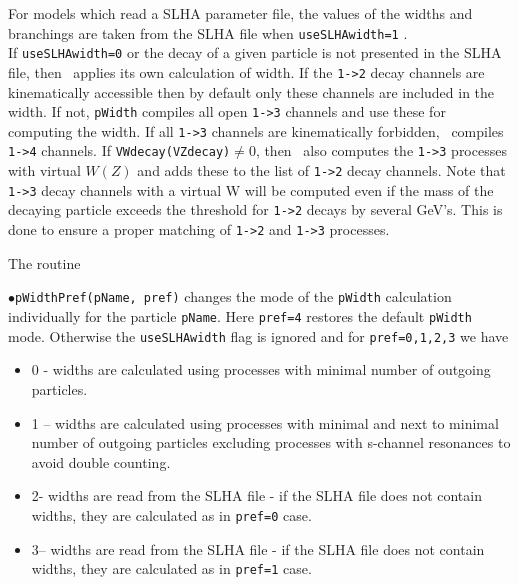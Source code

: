 \documentclass[12pt,a4paper]{article}
\begin{document}
For models which read a SLHA parameter file, the values of the widths and branchings are taken from the SLHA
file when \verb|useSLHAwidth=1| .\\[2mm] If \verb|useSLHAwidth=0| or the decay of a  given particle is not presented in the SLHA file, then \micro\ applies its own 
calculation of width.  
If the  \verb|1->2| decay channels are kinematically accessible 
then by default  only these channels are
included in the width. If not, {\tt pWidth} compiles all open \verb|1->3| channels and use these for  computing the width.
If all \verb|1->3| channels are kinematically forbidden, \micro\ compiles \verb|1->4| channels.
If \verb|VWdecay(VZdecay)|$\ne 0$, then \micro\  also computes   the \verb|1->3|   processes with virtual $W(Z)$  and adds these to the list of \verb|1->2| decay channels.
 Note that \verb|1->3| decay channels with a virtual W  will be computed even
if the mass of the decaying particle exceeds the threshold for \verb|1->2| decays by several GeV's. This is done to ensure a 
proper matching of \verb|1->2| and \verb|1->3| processes.


The routine 

\noindent
$\bullet$\verb|pWidthPref(pName, pref)| changes the mode of the {\tt pWidth} calculation individually for the particle {\tt pName}. Here {\tt pref=4} restores the default {\tt pWidth} mode. Otherwise the 
{\tt useSLHAwidth}  flag is ignored and for {\tt pref=0,1,2,3} we have    
%
%
\begin{itemize}
\item{} 0 -  widths are calculated using processes with minimal number of outgoing particles.
\item{}1 -- widths are calculated using processes with minimal and next to minimal number of outgoing particles excluding
                       processes with  s-channel resonances to avoid double counting.
\item{} 2- widths are read from the SLHA file - if the SLHA file does not contain widths, they are calculated as in {\tt pref=0} case.
\item{} 3-- widths are read from the SLHA file - if the SLHA file does not contain widths, they are calculated as in {\tt pref=1} case.
\end{itemize}
\end{document}
